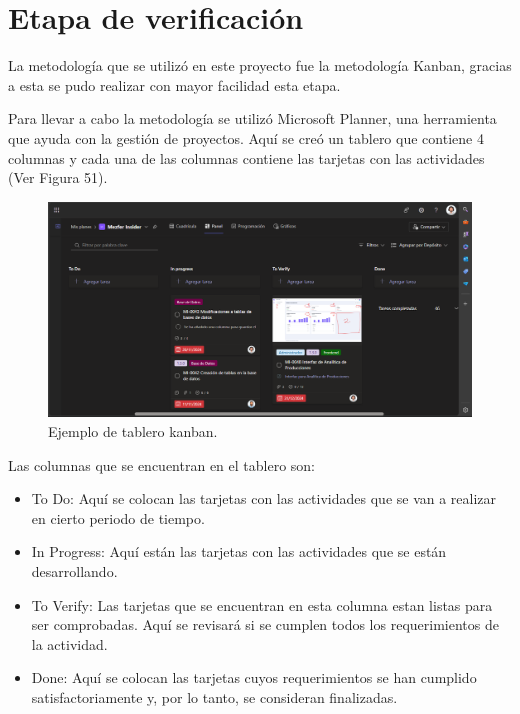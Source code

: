 \section{Etapa de verificación}
La metodología que se utilizó en este proyecto fue la metodología Kanban, gracias a esta se pudo realizar con mayor facilidad esta etapa.

Para llevar a cabo la metodología se utilizó Microsoft Planner, una herramienta que ayuda con la gestión de proyectos. Aquí se creó un tablero que contiene 4 columnas y cada una de las columnas contiene las tarjetas con las actividades (Ver Figura 51).

    \begin{figure}[H]
        \begin{center}
            \includegraphics[scale=0.35]{img/resultados/tablero-kanban.png}
            \caption{Ejemplo de tablero kanban.}
            \label{fig:tablero-kanban}
        \end{center}
    \end{figure}

Las columnas que se encuentran en el tablero son:
    \begin{itemize}
        \item To Do: Aquí se colocan las tarjetas con las actividades que se van a realizar en cierto periodo de tiempo.
        \item In Progress: Aquí están las tarjetas con las actividades que se están desarrollando.
        \item To Verify: Las tarjetas que se encuentran en esta columna estan listas para ser comprobadas. Aquí se revisará si se cumplen todos los requerimientos de la actividad.
        \item Done: Aquí se colocan las tarjetas cuyos requerimientos se han cumplido satisfactoriamente y, por lo tanto, se consideran finalizadas.
    \end{itemize}

